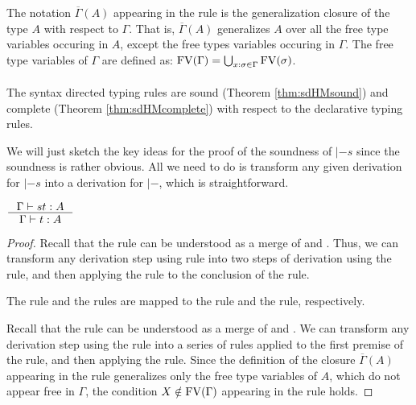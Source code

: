 The notation $\overline{\Gamma}(A)$ appearing in the rule  is
the generalization closure of the type $A$ with respect to $\Gamma$. 
That is, $\overline{\Gamma}(A)$
generalizes $A$ over all the free type variables occuring in $A$, except the free types
variables occuring in $\Gamma$. The free type variables of $\Gamma$ are defined as:
$\mathop{\mathrm{FV}}(\Gamma) = \bigcup_{x:\sigma\in \Gamma} \mathop{\mathrm{FV}}(\sigma)$.

\paragraph{}
The syntax directed typing rules are sound (Theorem \ref{thm:sdHMsound})
and complete (Theorem \ref{thm:sdHMcomplete}) with respect to
the declarative typing rules.

We will just sketch the key ideas for the proof of the soundness of $|-s$
since the soundness is rather obvious. All we need to do is transform
any given derivation for $|-s$ into a derivation for $|-$, which is
straightforward.
\begin{theorem}
$ \inference{\Gamma |-s t : A}{\Gamma |- t : A} $
\label{thm:sdHMsound}
\end{theorem}
\begin{proof}
Recall that the  rule can be understood as a merge of
 and . Thus, we can transform any derivation
step using  rule into two steps of derivation using
the  rule, and then applying the  rule
to the conclusion of the  rule.

The  rule and the  rules are mapped
to the  rule and the  rule, respectively.

Recall that the  rule can be understood as a merge of
 and . We can transform any derivation step
using the  rule into a series of  rules
applied to the first premise of the  rule, and then applying
the  rule. Since the definition of the closure
$\overline{\Gamma}(A)$ appearing in the  rule
generalizes only the free type variables of $A$, which do not
appear free in $\Gamma$, the condition $X\notin\mathop{\mathrm{FV}}(\Gamma)$ appearing
in the  rule holds.
\end{proof}


